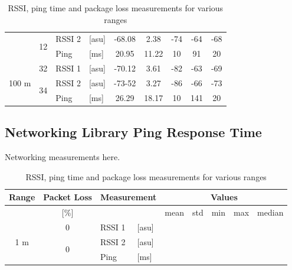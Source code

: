 \begin{table}[H]
\begin{tabular}{|c|c|l|l|c|c|c|c|c|}
        & \multirow{2}{*}{12} & RSSI 2 & [asu] & -68.08 & 2.38 & -74 & -64 & -68 \\\cline{3-9}
        && Ping & [ms] & 20.95 & 11.22 & 10 & 91 & 20 \\\hline\hline
        \multirow{3}{*}{100 m} & \multirow{1}{*}{32} & RSSI 1 & [asu] & -70.12 & 3.61 & -82 & -63 & -69 \\\cline{2-9}\cline{2-9}
        & \multirow{2}{*}{34} & RSSI 2 & [asu] & -73-52 & 3.27 & -86 & -66 & -73 \\\cline{3-9}
        && Ping & [ms] & 26.29 & 18.17 & 10 & 141 & 20 \\\hline
    \end{tabular}
    \vspace{\ftspace}
    \caption{RSSI, ping time and package loss measurements for various ranges}
    \label{tab:ping_rssi_res}
\end{table}


\subsection{\label{sec:res_ping}Networking Library Ping Response Time}

Networking measurements here.

\begin{table}[H]
    \centering
    \begin{tabular}{|c|c|l|l|c|c|c|c|c|}
    \hline
        Range & Packet Loss & \multicolumn{2}{l|}{Measurement} & \multicolumn{5}{c|}{Values} \\\hline
        [meters] & [\%] & \multicolumn{2}{l|}{} & mean & std & min & max & median \\\hline\hline
        \multirow{3}{*}{1 m} & \multirow{1}{*}{0} & RSSI 1 & [asu] &  &  &  &  &  \\\cline{2-9}\cline{2-9}
        & \multirow{2}{*}{0} & RSSI 2 & [asu] &  &  &  &  &  \\\cline{3-9}
        && Ping & [ms] &  &  &  &  &  \\\hline
    \end{tabular}
    \vspace{\ftspace}
    \caption{RSSI, ping time and package loss measurements for various ranges}
    \label{tab:ping}
\end{table}

